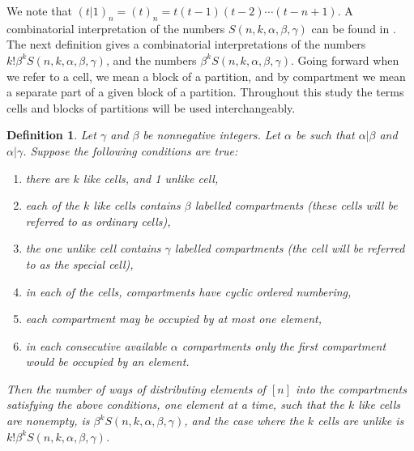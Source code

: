 \documentclass[12pt]{amsart}
\newtheorem{proof 1}{proof 1}
\newtheorem{definition}{Definition}[section]
\begin{document}
We note that $(t|1)_n=(t)_n=t(t-1)(t-2)\cdots(t-n+1)$. A combinatorial interpretation of the numbers $S(n,k,\alpha,\beta,\gamma)$ can be found in \cite{benyi2022unfair}.  The next definition gives a combinatorial interpretations of the numbers $k!\beta^kS(n,k,\alpha,\beta,\gamma)$, and the numbers $\beta^kS(n,k,\alpha,\beta,\gamma)$. Going forward when we refer to a cell, we mean a block of a partition, and by compartment we mean a separate part of a given block of a partition. Throughout this study the terms cells and blocks of partitions will be used interchangeably.
\begin{definition}\cite{corcino2001combinatorial}\label{definition:10}
	Let $\gamma$ and $\beta$ be nonnegative integers. Let $\alpha$ be such that ${\alpha}|\beta$ and ${\alpha}|\gamma$. Suppose the following conditions are true:
	\begin{enumerate}
		\item there are $k$ like cells, and 1 unlike cell,
		\item each of the $k$ like cells contains $\beta$ labelled compartments (these cells will be referred to as \textit{ordinary cells}),
		\item  the one unlike cell contains $\gamma$ labelled compartments (the cell will be referred to as the \textit{special cell}),
		\item  in each of the cells, compartments have cyclic ordered numbering,
		\item each compartment may be occupied by at most one element,
		\item in each consecutive available $\alpha$ compartments only the first compartment would be occupied by an element.
	\end{enumerate}
	Then the number of ways of distributing elements of $[n]$ into the compartments satisfying the above conditions, one element at a time, such that the  $k$ like cells are nonempty, is $\beta^kS(n,k,\alpha,\beta,\gamma)$, and the case where the $k$ cells are unlike is $k!\beta^kS(n,k,\alpha,\beta,\gamma)$.
\end{definition}
\end{document}
